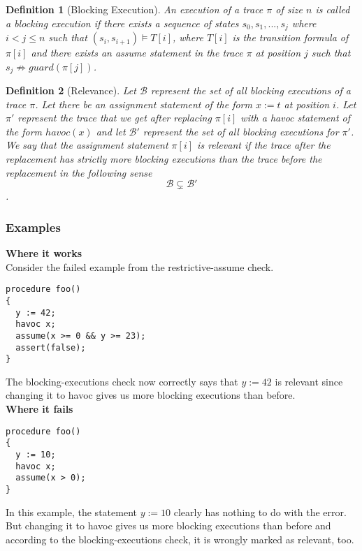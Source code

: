 \documentclass{article}
\newcommand{\limp}{\Rightarrow}
\newtheorem{mydef}{Definition}
\begin{document}
\begin{mydef}[Blocking Execution]\label{mydef:blockingexecution_definition}
An execution of a trace $\pi$ of size $n$ is called a \emph{blocking execution} if there exists a sequence of states $s_0, s_1,..., s_j$ where $i<j \leq n$ such that $(s_i, s_{i+1}) \models T[i]$, where $T[i]$ is the transition formula of $\pi[i]$ and there exists an assume statement in the trace $\pi$ at position $j$ such that $s_{j} \not \limp guard(\pi[j])$.
\end{mydef}

\begin{mydef}[Relevance]\label{mydef:relevancy_definition}
Let $\mathcal{B}$ represent the set of all blocking executions of a trace $\pi$. Let there be an assignment statement of the form $x:=t$ at position $i$. Let $\pi'$ represent the trace that we get after replacing $\pi[i]$ with a havoc statement of the form $havoc(x)$ and let $\mathcal{B}'$ represent the set of all blocking executions for $\pi'$.\\
We say that the assignment statement $\pi[i]$ is relevant if the trace after the replacement has strictly more blocking executions than the trace before the replacement in the following sense $$\mathcal{B} \subsetneq \mathcal{B}'$$. 
\end{mydef}
\subsubsection{Examples}
\textbf{Where it works}\\
Consider the failed example from the restrictive-assume check. 
\begin{lstlisting}
procedure foo()
{
  y := 42;
  havoc x;
  assume(x >= 0 && y >= 23);
  assert(false);
}
\end{lstlisting}
The blocking-executions check now correctly says that $y:=42$ is relevant since changing it to havoc gives us more blocking executions than before.\\
\textbf{Where it fails}
\begin{lstlisting}
procedure foo()
{
  y := 10;
  havoc x;
  assume(x > 0);
}
\end{lstlisting}
In this example, the statement $y:=10$ clearly has nothing to do with the error. But changing it to havoc gives us more blocking executions than before and according to the blocking-executions check, it is wrongly marked as relevant, too. 

\newpage
\end{document}

